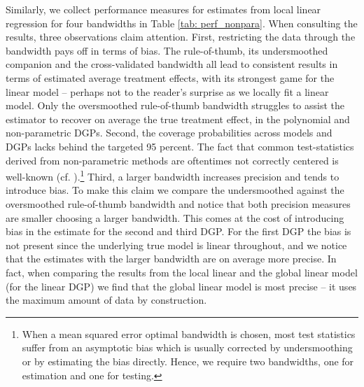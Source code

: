 \documentclass[11pt, a4paper, leqno]{article}
\numberwithin{equation}{section}
\numberwithin{figure}{section}
\numberwithin{table}{section}
\numberwithin{algorithm}{section}
\begin{document}
Similarly, we collect performance measures for estimates from local linear regression for four bandwidths in Table \ref{tab: perf_nonpara}. When consulting the results, three observations claim attention. First, restricting the data through the bandwidth pays off in terms of bias. The rule-of-thumb, its undersmoothed companion and the cross-validated bandwidth all lead to consistent results in terms of estimated average treatment effects, with its strongest game for the linear model -- perhaps not to the reader's surprise as we locally fit a linear model. Only the oversmoothed rule-of-thumb bandwidth struggles to assist the estimator to recover on average the true treatment effect, in the polynomial and non-parametric DGPs. Second, the coverage probabilities across models and DGPs lacks behind the targeted 95 percent. The fact that common test-statistics derived from non-parametric methods are oftentimes not correctly centered is well-known (cf. \cite{wasserman}).\footnote{When a mean squared error optimal bandwidth is chosen, most test statistics suffer from an asymptotic bias which is usually corrected by undersmoothing or by estimating the bias directly. Hence, we require two bandwidths, one for estimation and one for testing.} Third, a larger bandwidth increases precision and tends to introduce bias. To make this claim we compare the undersmoothed against the oversmoothed rule-of-thumb bandwidth and notice that both precision measures are smaller choosing a larger bandwidth. This comes at the cost of introducing bias in the estimate for the second and third DGP. For the first DGP the bias is not present since the underlying true model is linear throughout, and we notice that the estimates with the larger bandwidth are on average more precise. In fact, when comparing the results from the local linear and the global linear model (for the linear DGP) we find that the global linear model is most precise -- it uses the maximum amount of data by construction.
\end{document}
